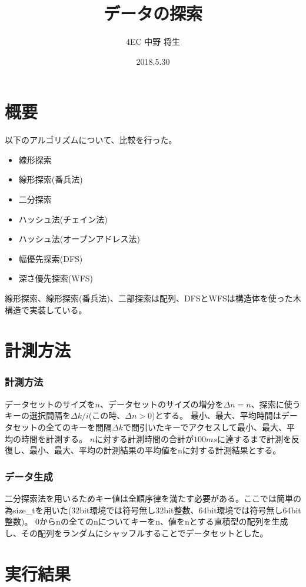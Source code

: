 \documentclass[dvipdfmx]{jsarticle}
\author{4EC 中野 将生}
\date{2018.5.30}
\title{データの探索}
\begin{document}
	\maketitle
	\section{概要}
		以下のアルゴリズムについて、比較を行った。
		\begin{itemize}
			\item 線形探索
			\item 線形探索(番兵法)
			\item 二分探索
			\item ハッシュ法(チェイン法)
			\item ハッシュ法(オープンアドレス法)
			\item 幅優先探索(DFS)
			\item 深さ優先探索(WFS)
		\end{itemize}
		線形探索、線形探索(番兵法)、二部探索は配列、DFSとWFSは構造体を使った木構造で実装している。
	\section{計測方法}
		\subsubsection{計測方法}
			データセットのサイズを$n$、データセットのサイズの増分を$\Delta n = n$、探索に使うキーの選択間隔を$\Delta k/i$(この時、$\Delta n > 0$)とする。
			最小、最大、平均時間はデータセットの全てのキーを間隔$\Delta k$で間引いたキーでアクセスして最小、最大、平均の時間を計測する。
			$n$に対する計測時間の合計が$100 ms$に達するまで計測を反復し、最小、最大、平均の計測結果の平均値をnに対する計測結果とする。
		\subsubsection{データ生成}
			二分探索法を用いるためキー値は全順序律を満たす必要がある。ここでは簡単の為size\_tを用いた(32bit環境では符号無し32bit整数、64bit環境では符号無し64bit整数)。
			0からnの全てのnについてキーをn、値をnとする直積型の配列を生成し、その配列をランダムにシャッフルすることでデータセットとした。
	\section{実行結果}
\end{document}
